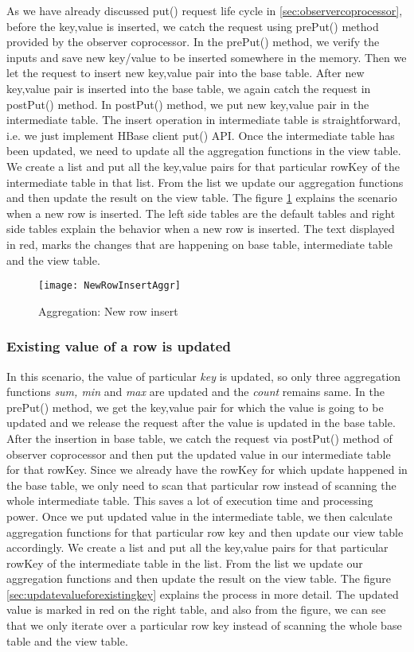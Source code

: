 \documentclass[11pt,a4paper,bibtotoc,idxtotoc,headsepline,footsepline,footexclude,BCOR12mm,DIV13]{scrbook}
\begin{document}
As we have already discussed put() request life cycle in \ref{sec:observercoprocessor}, before the key,value is inserted, we catch the request using prePut() method provided by the observer coprocessor. In the prePut() method, we verify the inputs and save new key/value to be inserted somewhere in the memory. Then we let the request to insert new key,value pair into the base table. After new key,value pair is inserted into the base table, we again catch the request in postPut() method. In postPut() method, we put new key,value pair in the intermediate table. The insert operation in intermediate table is straightforward, i.e. we just implement HBase client put() API. Once the intermediate table has been updated, we need to update all the aggregation functions in the view table. We create a list and put all the key,value pairs for that particular rowKey of the intermediate table in that list. From the list we update our aggregation functions and then update the result on the view table. The figure \ref{sec:newrowinsertagggregation} explains the scenario when a new row is inserted. The left side tables are the default tables and right side tables explain the behavior when a new row is inserted. The text displayed in red, marks the changes that are happening on base table, intermediate table and the view table. 
\begin{figure}
    \centering
    \texttt{[image: NewRowInsertAggr]}
    \caption{Aggregation: New row insert}
    \label{sec:newrowinsertagggregation}
    
\end{figure}

\newpage
\subsubsection{Existing value of a row is updated}
In this scenario, the value of particular \emph{key} is updated, so only three aggregation functions \emph{sum, min} and \emph{max} are updated and the \emph{count} remains same. In the prePut() method, we get the key,value pair for which the value is going to be updated and we release the request after the value is updated in the base table. After the insertion in base table, we catch the request via postPut() method of observer coprocessor and then put the updated value in our intermediate table for that rowKey. Since we already have the rowKey for which update happened in the base table, we only need to scan that particular row instead of scanning the whole intermediate table. This saves a lot of execution time and processing power. Once we put updated value in the intermediate table, we then calculate aggregation functions for that particular row key and then update our view table accordingly. We create a list and put all the key,value pairs for that particular rowKey of the intermediate table in the list. From the list we update our aggregation functions and then update the result on the view table. The figure \ref{sec:updatevalueforexistingkey} explains the process in more detail. The updated value is marked in red on the right table, and also from the figure, we can see that we only iterate over a particular row key instead of scanning the whole base table and the view table.
\end{document}

